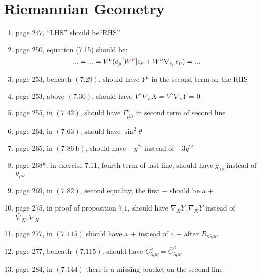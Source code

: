 \documentclass{article}
\newcommand\Dag{\textsuperscript{\dagger}}
\begin{document}
\section*{Riemannian Geometry}

\begin{enumerate}

\item page 247, ``LHS'' should be``RHS''
\item page 250\Dag, equation (7.15) should be:
  \[... = ... = V^\mu(e_\mu[W^{\color{red} \nu}]e_\nu+W^\nu\nabla_{e_\mu}e_\nu) = ...\]
  
\item page 253, beneath $(7.29)$, should have $Y^{\mu}$ in the second term on the $\mathrm{RHS}$

\item page 253, above $(7.30)$, should have $V^{\kappa} \nabla_{\kappa} X=V^{\kappa} \nabla_{\kappa} Y=0$

\item page 255, in $(7.42)$, should have $\Gamma_{\mu \lambda}^{\eta}$ in second term of second line

\item page 264, in $(7.63)$, should have $\sin ^{2} \theta$

\item page 265, in $(7.86 \mathrm{~b})$, should have $-y^{\prime 2}$ instead of $+3 y^{\prime 2}$

\item page 268*, in exercise $7.11$, fourth term of last line, should have $g_{\lambda \nu}$ instead of $g_{\mu \nu}$

\item page 269, in $(7.82)$, second equality, the first $-$ should be a $+$

\item page 275, in proof of proposition $7.1$, should have $\bar{\nabla}_{X} Y, \nabla_{X} Y$ instead of $\bar{\nabla}_{X}, \nabla_{X}$

\item page 277, in $(7.115)$ should have a $+$ instead of a $-$ after $R_{\kappa \lambda \mu \nu}$

\item page 277, beneath $(7.115)$, should have $C^{\kappa} _{\lambda \mu \nu}=\bar{C}^{\kappa} _{\lambda \mu \nu}$

\item page 284, in $(7.144)$ there is a missing bracket on the second line


\end{enumerate}
\end{document}
